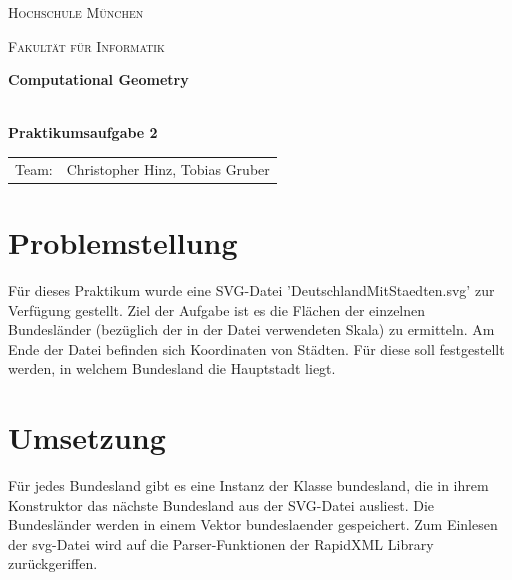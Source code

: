\documentclass[12pt]{scrartcl}
\begin{document}
\begin{titlepage}
    \vfill
	\centering
	{\scshape\LARGE Hochschule München \par}
    {\scshape\Large Fakultät für Informatik \par}
	\vspace{1.5cm}




    \vfill
	{\LARGE\bfseries Computational Geometry\\~\\ \par}
	{\LARGE\bfseries Praktikumsaufgabe 2\par}
	\vfill
    \vfill


    \begin{tabular}{ll}
    \normalsize
    Team:  & Christopher Hinz, Tobias Gruber\\
    \end{tabular}

	\vfill

\end{titlepage}

\newpage



\raggedright

\section{Problemstellung}
Für dieses Praktikum wurde eine SVG-Datei 'DeutschlandMitStaedten.svg' zur Verfügung gestellt. Ziel der Aufgabe ist es die Flächen der einzelnen Bundesländer (bezüglich der in der Datei verwendeten Skala) zu ermitteln.
Am Ende der Datei befinden sich Koordinaten von Städten. Für diese soll festgestellt werden, in welchem Bundesland die Hauptstadt liegt.


\section{Umsetzung}

Für jedes Bundesland gibt es eine Instanz der Klasse bundesland, die in ihrem Konstruktor das nächste Bundesland aus der SVG-Datei ausliest.
Die Bundesländer werden in einem Vektor bundeslaender gespeichert.
Zum Einlesen der svg-Datei wird auf die Parser-Funktionen der RapidXML Library zurückgeriffen.

\ \\~\\
\end{document}

